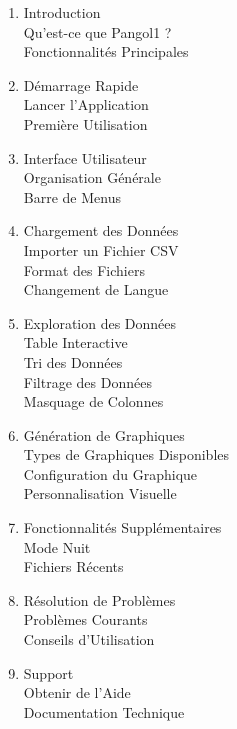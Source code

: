 \documentclass[11pt, a4paper]{article}
\begin{document}
\begin{enumerate}
    \item Introduction \\
     Qu'est-ce que Pangol1 ? \\
     Fonctionnalités Principales
    
    \item Démarrage Rapide \\
     Lancer l'Application \\
     Première Utilisation
    
    \item Interface Utilisateur \\
     Organisation Générale \\
     Barre de Menus
    
    \item Chargement des Données \\
     Importer un Fichier CSV \\
     Format des Fichiers \\
     Changement de Langue
    
    \item Exploration des Données \\
     Table Interactive \\
     Tri des Données \\
     Filtrage des Données \\
     Masquage de Colonnes
    
    \item Génération de Graphiques \\
     Types de Graphiques Disponibles \\
     Configuration du Graphique \\
     Personnalisation Visuelle
    
    \item Fonctionnalités Supplémentaires \\
     Mode Nuit \\
     Fichiers Récents
    
    \item Résolution de Problèmes \\
     Problèmes Courants \\
     Conseils d'Utilisation
    
    \item Support \\
     Obtenir de l'Aide \\
     Documentation Technique
\end{enumerate}
\end{document}
